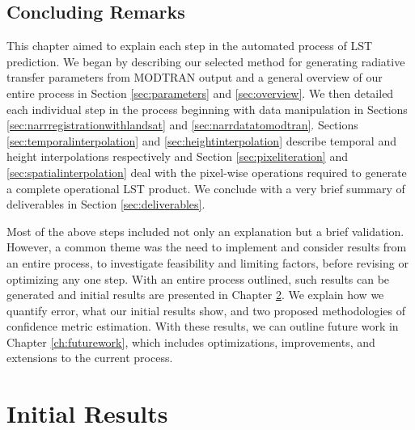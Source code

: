 \documentclass{book}
\begin{document}
\section{Concluding Remarks}

This chapter aimed to explain each step in the automated process of LST prediction.  We began by describing our selected method for generating radiative transfer parameters from MODTRAN output and a general overview of our entire process in Section \ref{sec:parameters} and \ref{sec:overview}.  We then detailed each individual step in the process beginning with data manipulation in Sections \ref{sec:narrregistrationwithlandsat} and \ref{sec:narrdatatomodtran}.  Sections \ref{sec:temporalinterpolation} and \ref{sec:heightinterpolation} describe temporal and height interpolations respectively and Section \ref{sec:pixeliteration} and \ref{sec:spatialinterpolation} deal with the pixel-wise operations required to generate a complete operational LST product.  We conclude with a very brief summary of deliverables in Section \ref{sec:deliverables}.

Most of the above steps included not only an explanation but a brief validation.  However, a common theme was the need to implement and consider results from an entire process, to investigate feasibility and limiting factors, before revising or optimizing any one step.  With an entire process outlined, such results can be generated and initial results are presented in Chapter \ref{ch:initialresults}.  We explain how we quantify error, what our initial results show, and two proposed methodologies of confidence metric estimation.  With these results, we can outline future work in Chapter \ref{ch:futurework}, which includes optimizations, improvements, and extensions to the current process.

\chapter{Initial Results}
\label{ch:initialresults}
\end{document}
